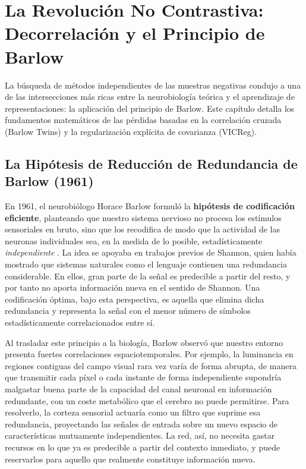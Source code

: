 \chapter{La Revolución No Contrastiva: Decorrelación y el Principio de Barlow}
\label{cap:nocontrastive}

La búsqueda de métodos independientes de las muestras negativas condujo a una de las intersecciones más ricas entre la neurobiología teórica y el aprendizaje de representaciones: la aplicación del principio de Barlow. Este capítulo detalla los fundamentos matemáticos de las pérdidas basadas en la correlación cruzada (Barlow Twins) y la regularización explícita de covarianza (VICReg).

\section{La Hipótesis de Reducción de Redundancia de Barlow (1961)}
\label{sec:barlow_hipotesis}
En 1961, el neurobiólogo Horace Barlow formuló la \textbf{hipótesis de codificación eficiente}, planteando que nuestro sistema nervioso no procesa los estímulos sensoriales en bruto, sino que los recodifica de modo que la actividad de las neuronas individuales sea, en la medida de lo posible, estadísticamente \textit{independiente} \cite{barlow1961possible}. La idea se apoyaba en trabajos previos de Shannon, quien había mostrado que sistemas naturales como el lenguaje contienen una redundancia considerable. En ellos, gran parte de la señal es predecible a partir del resto, y por tanto no aporta información nueva en el sentido de Shannon. Una codificación óptima, bajo esta perspectiva, es aquella que elimina dicha redundancia y representa la señal con el menor número de símbolos estadísticamente correlacionados entre sí.

Al trasladar este principio a la biología, Barlow observó que nuestro entorno presenta fuertes correlaciones espaciotemporales. Por ejemplo, la luminancia en regiones contiguas del campo visual rara vez varía de forma abrupta, de manera que transmitir cada píxel o cada instante de forma independiente supondría malgastar buena parte de la capacidad del canal neuronal en información redundante, con un coste metabólico que el cerebro no puede permitirse. Para resolverlo, la corteza sensorial actuaría como un filtro que suprime esa redundancia, proyectando las señales de entrada sobre un nuevo espacio de características mutuamente independientes. La red, así, no necesita gastar recursos en lo que ya es predecible a partir del contexto inmediato, y puede reservarlos para aquello que realmente constituye información nueva.

